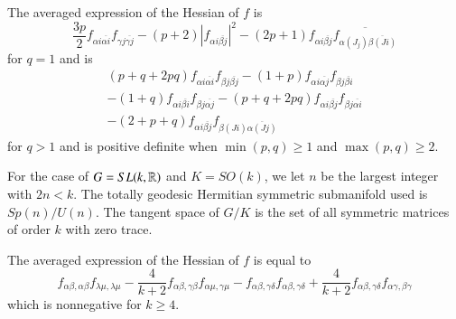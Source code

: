 The averaged expression of the Hessian of $f$ is
$$
\dfrac{3p}{2}f_{\alpha i \overline{\alpha i}}f_{\gamma j \overline{\gamma j}}-(p +2)|f_{\alpha i \overline{\beta j}}|^{2}-(2p +1)f_{\alpha i \overline{\beta j}}\overline{f_{\alpha(J_{j})\overline{\beta(Ji)}}}
$$
for $q=1$ and is
\begin{gather*}
(p + q + 2pq)f_{\alpha i \overline{\alpha i}}f_{\beta j \overline{\beta j}}-(1 + p)f_{\alpha i \overline{\alpha j}}f_{\beta j \overline{\beta i}}\\
-(1 +q)f_{\alpha i \overline{\beta i}}f_{\beta j \overline{\alpha  j}}-(p + q + 2pq)f_{\alpha i \overline{\beta j}}f_{\beta j \overline{\alpha i}}\\
-(2 + p + q)f_{\alpha i \overline{\beta j}}f_{\beta (Ji)\overline{\alpha(J j)}}  
\end{gather*}
for $q > 1$ and is positive definite when $\min(p,q)\geq 1$ and $\max(p,q)\geq 2$.

For the case of $G=SL(k, \mathbb{R})$ and $K=SO(k)$, we let $n$ be the largest integer with $2n < k$. The totally geodesic Hermitian symmetric submanifold used is $Sp(n)/U(n)$. The tangent space of $G/K$ is the set of all symmetric matrices of order $k$ with zero trace.

The averaged expression of the Hessian of $f$ is equal to
$$
f_{\alpha \beta, \alpha\beta}f_{\lambda \mu, \lambda \mu} - \dfrac{4}{k + 2}f_{\alpha \beta, \gamma \beta}f_{\alpha \mu, \gamma \mu}- f_{\alpha \beta, \gamma \delta}f_{\alpha \beta, \gamma \delta} + \dfrac{4}{k+2}f_{\alpha \beta, \gamma \delta}f_{\alpha \gamma , \beta \gamma}
$$
which is nonnegative for $k \geq 4$.

